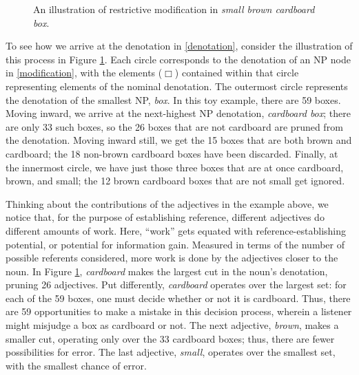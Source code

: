 \documentclass[preprint,authoryear]{elsarticle}\frenchspacing
\begin{document}
\begin{figure}[t]
	\caption{An illustration of restrictive modification in \emph{small brown cardboard box}.}\label{mod-fig}
\end{figure}


To see how we arrive at the denotation in \ref{denotation}, consider the illustration of this process in Figure \ref{mod-fig}. Each circle corresponds to the denotation of an NP node in \ref{modification}, with the elements ($\Box$) contained within that circle representing elements of the nominal denotation. The outermost circle represents the denotation of the smallest NP, \emph{box}. In this toy example, there are 59 boxes. Moving inward, we arrive at the next-highest NP denotation, \emph{cardboard box}; there are only 33 such boxes, so the 26 boxes that are not cardboard are pruned from the denotation. Moving inward still, we get the 15 boxes that are both brown and cardboard; the 18 non-brown cardboard boxes have been discarded. Finally, at the innermost circle, we have just those three boxes that are at once cardboard, brown, and small; the 12 brown cardboard boxes that are not small get ignored.

Thinking about the contributions of the adjectives in the example above, we notice that, for the purpose of establishing reference, different adjectives do different amounts of work. Here, ``work'' gets equated with reference-establishing potential, or potential for information gain. Measured in terms of the number of possible referents considered, more work is done by the adjectives closer to the noun. In Figure \ref{mod-fig}, \emph{cardboard} makes the largest cut in the noun's denotation, pruning 26 adjectives. Put differently, \emph{cardboard} operates over the largest set: for each of the 59 boxes, one must decide whether or not it is cardboard. Thus, there are 59 opportunities to make a mistake in this decision process, wherein a listener might misjudge a box as cardboard or not. The next adjective, \emph{brown}, makes a smaller cut, operating only over the 33 cardboard boxes; thus, there are fewer possibilities for error. The last adjective, \emph{small}, operates over the smallest set, with the smallest chance of error.
\end{document}
